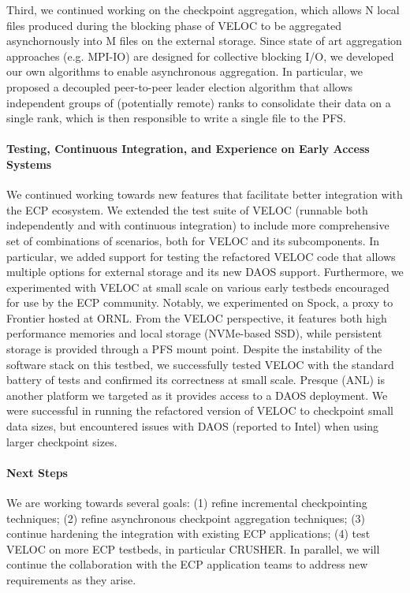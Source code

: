 Third, we continued working on the checkpoint aggregation, which allows
N local files produced during the blocking phase of VELOC to be aggregated
asynchornously into M files on the external storage. Since state of
art aggregation approaches (e.g. MPI-IO) are designed for collective
blocking I/O, we developed our own algorithms to enable asynchronous
aggregation. In particular, we proposed a decoupled peer-to-peer
leader election algorithm that allows independent groups of (potentially
remote) ranks to consolidate their data on a single rank, which is then
responsible to write a single file to the PFS.

\paragraph{Testing, Continuous Integration, and Experience on Early Access Systems}
We continued working towards new features that facilitate better
integration with the ECP ecosystem. We extended the test suite of
VELOC (runnable both independently and with continuous integration) to
include more comprehensive set of combinations of scenarios, both for
VELOC and its subcomponents. In particular, we added support for
testing the refactored VELOC code that allows multiple options for
external storage and its new DAOS support. Furthermore, we
experimented with VELOC at small scale on various early testbeds
encouraged for use by the ECP community. Notably, we experimented on
Spock, a proxy to Frontier hosted at ORNL. From the VELOC perspective,
it features both high performance memories and local storage
(NVMe-based SSD), while persistent storage is provided through a PFS
mount point. Despite the instability of the software stack on this
testbed, we successfully tested VELOC with the standard battery of
tests and confirmed its correctness at small scale. Presque (ANL) is
another platform we targeted as it provides access to a DAOS
deployment. We were successful in running the refactored version of
VELOC to checkpoint small data sizes, but encountered issues with DAOS
(reported to Intel) when using larger checkpoint sizes.

\paragraph{Next Steps}
We are working towards several goals: (1) refine incremental
checkpointing techniques; (2) refine asynchronous checkpoint
aggregation techniques; (3) continue hardening the integration with
existing ECP applications; (4) test VELOC on more ECP testbeds, in
particular CRUSHER. In parallel, we will continue the collaboration
with the ECP application teams to address new requirements as they
arise.
